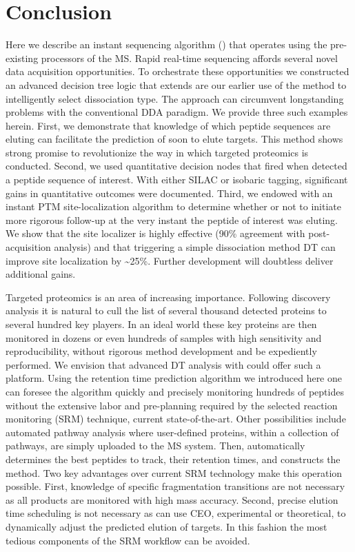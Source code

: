 \section{Conclusion}

Here we describe an instant sequencing algorithm (\inseq{}) that operates using the pre-existing processors of the MS. Rapid real-time sequencing affords several novel data acquisition opportunities. To orchestrate these opportunities we constructed an advanced decision tree logic that extends are our earlier use of the method to intelligently select dissociation type. The approach can circumvent longstanding problems with the conventional DDA paradigm. We provide three such examples herein. First, we demonstrate that knowledge of which peptide sequences are eluting can facilitate the prediction of soon to elute targets. This method shows strong promise to revolutionize the way in which targeted proteomics is conducted. Second, we used quantitative decision nodes that fired when \inseq{} detected a peptide sequence of interest. With either SILAC or isobaric tagging, significant gains in quantitative outcomes were documented. Third, we endowed \inseq{} with an instant PTM site-localization algorithm to determine whether or not to initiate more rigorous follow-up at the very instant the peptide of interest was eluting. We show that the \inseq{} site localizer is highly effective (90\% agreement with post-acquisition analysis) and that triggering a simple dissociation method DT can improve site localization by \textasciitilde25\%. Further development will doubtless deliver additional gains.

Targeted proteomics is an area of increasing importance. Following discovery analysis it is natural to cull the list of several thousand detected proteins to several hundred key players. In an ideal world these key proteins are then monitored in dozens or even hundreds of samples with high sensitivity and reproducibility, without rigorous method development and be expediently performed. We envision that advanced DT analysis with \inseq{} could offer such a platform. Using the retention time prediction algorithm we introduced here one can foresee the \inseq{} algorithm quickly and precisely monitoring hundreds of peptides without the extensive labor and pre-planning required by the selected reaction monitoring (SRM) technique, current state-of-the-art.\cite{srm} Other possibilities include automated pathway analysis where user-defined proteins, within a collection of pathways, are simply uploaded to the MS system. Then, \inseq{} automatically determines the best peptides to track, their retention times, and constructs the method. Two key advantages over current SRM technology make this operation possible. First, knowledge of specific fragmentation transitions are not necessary as all products are monitored with high mass accuracy. Second, precise elution time scheduling is not necessary as \inseq{} can use CEO, experimental or theoretical, to dynamically adjust the predicted elution of targets. In this fashion the most tedious components of the SRM workflow can be avoided.

